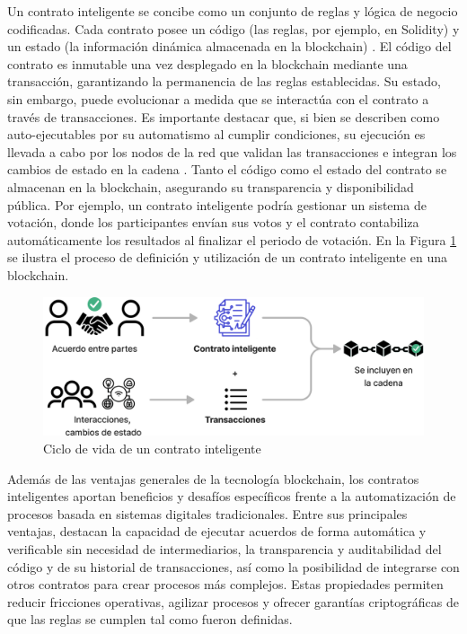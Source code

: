 Un contrato inteligente se concibe como un conjunto de reglas y lógica de negocio codificadas. Cada contrato posee un código (las reglas, por ejemplo, en Solidity) y un estado (la información dinámica almacenada en la blockchain) \cite{buterin2013ethereum}. El código del contrato es inmutable una vez desplegado en la blockchain mediante una transacción, garantizando la permanencia de las reglas establecidas. Su estado, sin embargo, puede evolucionar a medida que se interactúa con el contrato a través de transacciones. Es importante destacar que, si bien se describen como auto-ejecutables por su automatismo al cumplir condiciones, su ejecución es llevada a cabo por los nodos de la red que validan las transacciones e integran los cambios de estado en la cadena \cite{buterin2013ethereum}. Tanto el código como el estado del contrato se almacenan en la blockchain, asegurando su transparencia y disponibilidad pública. Por ejemplo, un contrato inteligente podría gestionar un sistema de votación, donde los participantes envían sus votos y el contrato contabiliza automáticamente los resultados al finalizar el periodo de votación. En la Figura \ref{fig:smart-contract-process} se ilustra el proceso de definición y utilización de un contrato inteligente en una blockchain.

\begin{figure}[!tb]
    \centering
    \includegraphics[width=\textwidth]{Figures/smart-contract-process.png}
    \caption{Ciclo de vida de un contrato inteligente}
    \label{fig:smart-contract-process}
\end{figure}

Además de las ventajas generales de la tecnología blockchain, los contratos inteligentes aportan beneficios y desafíos específicos frente a la automatización de procesos basada en sistemas digitales tradicionales. Entre sus principales ventajas, destacan la capacidad de ejecutar acuerdos de forma automática y verificable sin necesidad de intermediarios, la transparencia y auditabilidad del código y de su historial de transacciones, así como la posibilidad de integrarse con otros contratos para crear procesos más complejos. Estas propiedades permiten reducir fricciones operativas, agilizar procesos y ofrecer garantías criptográficas de que las reglas se cumplen tal como fueron definidas.

